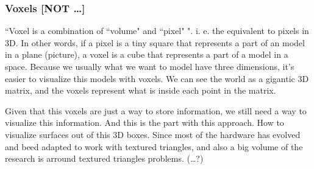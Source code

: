 
 \subsubsection{Voxels [NOT \dots]} %
 \label{ssub:voxels}

``Voxel is a combination of ``volume" and ``pixel" ". i. e. the equivalent to pixels in 3D. In other words, if a pixel is a tiny square that represents a part of an model in a plane (picture), a voxel is a cube that represents a part of a model in a space.
Because we usually what we want to model  have three dimensions, it's easier to visualize this models with voxels.
We can see the world as a gigantic 3D matrix, and the voxels represent what is inside each point in the matrix.

Given that this voxels are just a way to store information, we still need a way to visualize this information. And this is the \trikyd part with this approach. How to visualize surfaces out of this 3D boxes. Since most of the hardware has evolved and beed adapted to work with textured triangles, and also a big volume of the research is arround textured triangles problems.
(\dots?)
